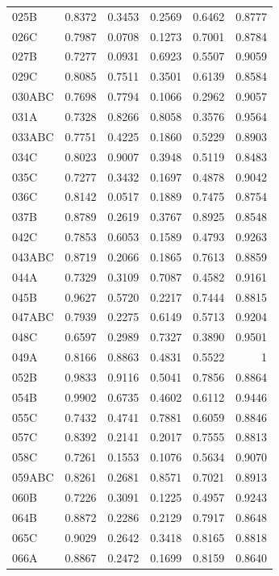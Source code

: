 \begin{longtable}{lrrrrr}
  025B & 0.8372 & 0.3453 & 0.2569 & 0.6462 & 0.8777 \\
  026C & 0.7987 & 0.0708 & 0.1273 & 0.7001 & 0.8784 \\
  027B & 0.7277 & 0.0931 & 0.6923 & 0.5507 & 0.9059 \\
  029C & 0.8085 & 0.7511 & 0.3501 & 0.6139 & 0.8584 \\
  030ABC & 0.7698 & 0.7794 & 0.1066 & 0.2962 & 0.9057 \\
  031A & 0.7328 & 0.8266 & 0.8058 & 0.3576 & 0.9564 \\
  033ABC & 0.7751 & 0.4225 & 0.1860 & 0.5229 & 0.8903 \\
  034C & 0.8023 & 0.9007 & 0.3948 & 0.5119 & 0.8483 \\
  035C & 0.7277 & 0.3432 & 0.1697 & 0.4878 & 0.9042 \\
  036C & 0.8142 & 0.0517 & 0.1889 & 0.7475 & 0.8754 \\
  037B & 0.8789 & 0.2619 & 0.3767 & 0.8925 & 0.8548 \\
  042C & 0.7853 & 0.6053 & 0.1589 & 0.4793 & 0.9263 \\
  043ABC & 0.8719 & 0.2066 & 0.1865 & 0.7613 & 0.8859 \\
  044A & 0.7329 & 0.3109 & 0.7087 & 0.4582 & 0.9161 \\
  045B & 0.9627 & 0.5720 & 0.2217 & 0.7444 & 0.8815 \\
  047ABC & 0.7939 & 0.2275 & 0.6149 & 0.5713 & 0.9204 \\
  048C & 0.6597 & 0.2989 & 0.7327 & 0.3890 & 0.9501 \\
  049A & 0.8166 & 0.8863 & 0.4831 & 0.5522 & 1 \\
  052B & 0.9833 & 0.9116 & 0.5041 & 0.7856 & 0.8864 \\
  054B & 0.9902 & 0.6735 & 0.4602 & 0.6112 & 0.9446 \\
  055C & 0.7432 & 0.4741 & 0.7881 & 0.6059 & 0.8846 \\
  057C & 0.8392 & 0.2141 & 0.2017 & 0.7555 & 0.8813 \\
  058C & 0.7261 & 0.1553 & 0.1076 & 0.5634 & 0.9070 \\
  059ABC & 0.8261 & 0.2681 & 0.8571 & 0.7021 & 0.8913 \\
  060B & 0.7226 & 0.3091 & 0.1225 & 0.4957 & 0.9243 \\
  064B & 0.8872 & 0.2286 & 0.2129 & 0.7917 & 0.8648 \\
  065C & 0.9029 & 0.2642 & 0.3418 & 0.8165 & 0.8818 \\
  066A & 0.8867 & 0.2472 & 0.1699 & 0.8159 & 0.8640 \\

\end{longtable}
